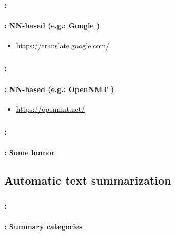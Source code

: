 \documentclass[xcolor=table]{beamer}
\begin{document}
\begin{frame}
	\frametitle{\insertshortsubtitle: \insertsection}
	\framesubtitle{\insertsubsection: NN-based (e.g.: Google \cite{16-wu-al})}
	
	\begin{itemize}
		\item \url{https://translate.google.com/}
	\end{itemize}
	\begin{center}
	\end{center}

\end{frame}

\begin{frame}
	\frametitle{\insertshortsubtitle: \insertsection}
	\framesubtitle{\insertsubsection: NN-based (e.g.: OpenNMT \cite{17-klein-al})}
	
	\begin{itemize}
		\item \url{https://opennmt.net/}
	\end{itemize}
	
\end{frame}

\begin{frame}
	\frametitle{\insertshortsubtitle: \insertsection}
	\framesubtitle{\insertsubsection: Some humor}
	
	\begin{center}
	\end{center}
	
\end{frame}

\subsection{Automatic text summarization}

\begin{frame}
	\frametitle{\insertshortsubtitle: \insertsection}
	\framesubtitle{\insertsubsection: Summary categories}
	
	
\end{frame}
\end{document}
